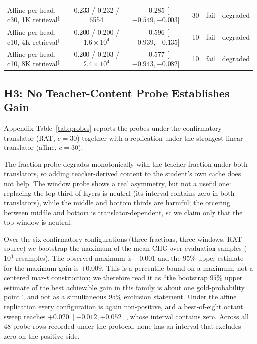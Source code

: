 \documentclass{article} %
\begin{document}
\begin{table}[t]
{\begin{tabular}{lccccl}
Affine per-head, c30, 1K retrieval$^{\ddagger}$ & 0.233 / 0.232 / 6554 & $-0.285$ [$-0.549, -0.003$] & 30 & fail & degraded \\
Affine per-head, c10, 4K retrieval$^{\ddagger}$ & 0.200 / 0.200 / $1.6\times10^{4}$ & $-0.596$ [$-0.939, -0.135$] & 10 & fail & degraded \\
Affine per-head, c10, 8K retrieval$^{\ddagger}$ & 0.200 / 0.203 / $2.4\times10^{4}$ & $-0.577$ [$-0.943, -0.082$] & 10 & fail & degraded \\
\bottomrule
\end{tabular}}
\end{table}

\subsection{H3: No Teacher-Content Probe Establishes Gain}
\label{sec:h3}
Appendix Table~\ref{tab:probes} reports the probes under the confirmatory
translator (RAT, $c{=}30$) together with a replication under the strongest
linear translator (affine, $c{=}30$).

The fraction probe degrades monotonically with the teacher fraction under both
translators, so adding teacher-derived content to the student's own cache does
not help. The window probe shows a real asymmetry, but not a useful one:
replacing the top third of layers is neutral (its interval contains zero in both
translators), while the middle and bottom thirds are harmful; the ordering
between middle and bottom is translator-dependent, so we claim only that the
top window is neutral.

Over the six confirmatory configurations (three fractions, three windows, RAT
source) we bootstrap the maximum of the mean CHG over evaluation samples
($10^4$ resamples). The observed maximum is $-0.001$ and the $95\%$ upper
estimate for the maximum gain is $+0.009$. This is a percentile bound on a
maximum, not a centered max-$t$ construction; we therefore read it as
``the bootstrap $95\%$ upper estimate of the best achievable gain in this family
is about one gold-probability point'', and not as a simultaneous $95\%$
exclusion statement. Under the affine replication every configuration is again
non-positive, and a best-of-eight octant sweep reaches $+0.020$
$[-0.012,+0.052]$, whose interval contains zero. Across all $48$ probe rows
recorded under the protocol, none has an interval that excludes zero on the
positive side.

\end{document}
